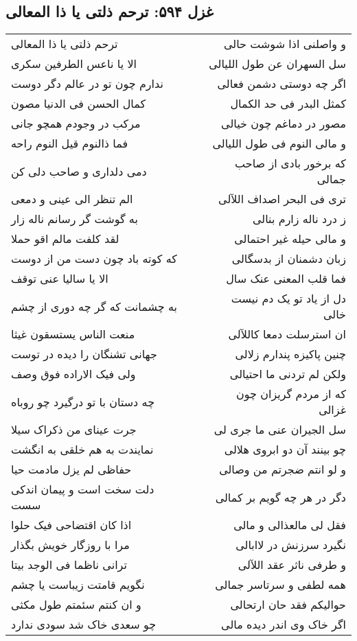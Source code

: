 \begin{center}
\section*{غزل ۵۹۴: ترحم ذلتی یا ذا المعالی}
\label{sec:594}
\begin{longtable}{l p{0.5cm} r}
ترحم ذلتی یا ذا المعالی
&&
و واصلنی اذا شوشت حالی
\\
الا یا ناعس الطرفین سکری
&&
سل السهران عن طول اللیالی
\\
ندارم چون تو در عالم دگر دوست
&&
اگر چه دوستی دشمن فعالی
\\
کمال الحسن فی الدنیا مصون
&&
کمثل البدر فی حد الکمال
\\
مرکب در وجودم همچو جانی
&&
مصور در دماغم چون خیالی
\\
فما ذالنوم قیل النوم راحه
&&
و مالی النوم فی طول اللیالی
\\
دمی دلداری و صاحب دلی کن
&&
که برخور بادی از صاحب جمالی
\\
الم تنظر الی عینی و دمعی
&&
تری فی البحر اصداف اللآلی
\\
به گوشت گر رسانم ناله زار
&&
ز درد ناله زارم بنالی
\\
لقد کلفت مالم اقو حملا
&&
و مالی حیله غیر احتمالی
\\
که کوته باد چون دست من از دوست
&&
زبان دشمنان از بدسگالی
\\
الا یا سالیا عنی توقف
&&
فما قلب المعنی عنک سال
\\
به چشمانت که گر چه دوری از چشم
&&
دل از یاد تو یک دم نیست خالی
\\
منعت الناس یستسقون غیثا
&&
ان استرسلت دمعا کاللآلی
\\
جهانی تشنگان را دیده در توست
&&
چنین پاکیزه پندارم زلالی
\\
ولی فیک الاراده فوق وصف
&&
ولکن لم تردنی ما احتیالی
\\
چه دستان با تو درگیرد چو روباه
&&
که از مردم گریزان چون غزالی
\\
جرت عینای من ذکراک سیلا
&&
سل الجیران عنی ما جری لی
\\
نمایندت به هم خلقی به انگشت
&&
چو بینند آن دو ابروی هلالی
\\
حفاظی لم یزل مادمت حیا
&&
و لو انتم ضجرتم من وصالی
\\
دلت سخت است و پیمان اندکی سست
&&
دگر در هر چه گویم بر کمالی
\\
اذا کان اقتضاحی فیک حلوا
&&
فقل لی مالعذالی و مالی
\\
مرا با روزگار خویش بگذار
&&
نگیرد سرزنش در لاابالی
\\
ترانی ناظما فی الوجد بیتا
&&
و طرفی ناثر عقد اللآلی
\\
نگویم قامتت زیباست یا چشم
&&
همه لطفی و سرتاسر جمالی
\\
و ان کنتم سئمتم طول مکثی
&&
حوالیکم فقد حان ارتحالی
\\
چو سعدی خاک شد سودی ندارد
&&
اگر خاک وی اندر دیده مالی
\\
\end{longtable}
\end{center}
